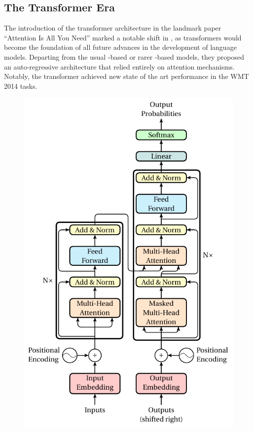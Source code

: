 \subsection{The Transformer Era} 

The introduction of the transformer architecture in the landmark paper ``Attention Is All You Need'' \citep{vaswani2017attention} marked a notable shift in \nlp, as transformers would become the foundation of all future advances in the development of language models. Departing from the usual \rnn-based or rarer \cnn-based models, they proposed an auto-regressive architecture that relied entirely on attention mechanisms. Notably, the transformer achieved new state of the art performance in the WMT 2014 tasks. 

\begin{figure}[!h]
    \begin{minipage}{0.6\columnwidth}
        \centering
        \includegraphics[width=\textwidth]{chapter2/pictures/transformer.pdf}

\end{minipage}
\end{figure}
